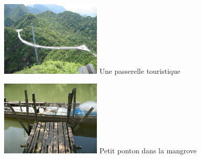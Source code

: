 \begin{multicols}{2}
\hspace*{-0.65cm}
\includegraphics[width=4.8cm]{articles/langkawi/1212398042f2k1.jpg}
Une passerelle touristique

\hspace*{-0.65cm}
\includegraphics[width=4.8cm]{articles/langkawi/1212397931akoQ.jpg}
Petit ponton dans la mangrove

\end{multicols}


